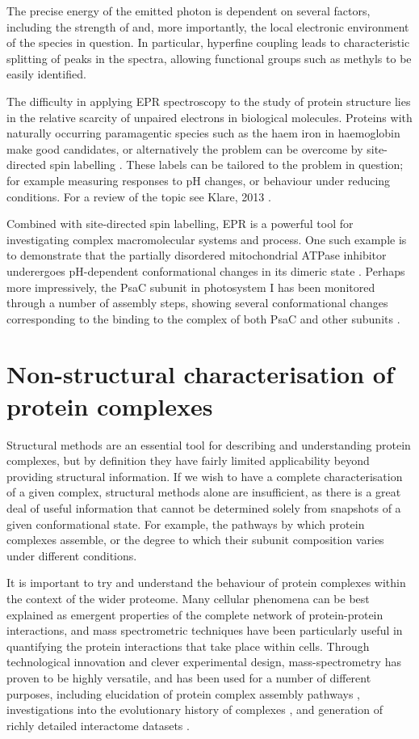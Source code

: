 \documentclass[a4paper,11pt,twoside,openright]{scrbook}
\begin{document}
The precise energy of the emitted photon is dependent on several factors,
including the strength of  and, more importantly, the local electronic
environment of the species in question. In particular, hyperfine coupling leads
to characteristic splitting of peaks in the spectra, allowing functional groups
such as methyls to be easily identified.

The difficulty in applying EPR spectroscopy to the study of protein structure
lies in the relative scarcity of unpaired electrons in biological molecules.
Proteins with naturally occurring paramagentic species such as the haem iron in
haemoglobin make good candidates, or alternatively the problem can be overcome
by site-directed spin labelling \cite{Altenbach1989,Altenbach1990}. These labels
can be tailored to the problem in question; for example measuring responses to
pH changes, or behaviour under reducing conditions. For a review of the topic
see Klare, 2013 \cite{Klare2013}.

Combined with site-directed spin labelling, EPR is a powerful tool for
investigating complex macromolecular systems and process. One such example is to
demonstrate that the partially disordered mitochondrial ATPase inhibitor
underergoes pH-dependent conformational changes in its dimeric state
\cite{LeBreton2016}. Perhaps more impressively, the PsaC subunit in photosystem
I has been monitored through a number of assembly steps, showing several
conformational changes corresponding to the binding to the complex of both PsaC
and other subunits \cite{Jagannathan2010}.

\section{Non-structural characterisation of protein complexes}
Structural methods are an essential tool for describing and understanding
protein complexes, but by definition they have fairly limited applicability
beyond providing structural information. If we wish to have a complete
characterisation of a given complex, structural methods alone are insufficient,
as there is a great deal of useful information that cannot be determined solely
from snapshots of a given conformational state. For example, the pathways by
which protein complexes assemble, or the degree to which their subunit
composition varies under different conditions.

It is important to try and understand the behaviour of protein complexes within
the context of the wider proteome. Many cellular phenomena can be best explained
as emergent properties of the complete network of protein-protein interactions,
and mass spectrometric techniques have been particularly useful in quantifying
the protein interactions that take place within cells. Through technological
innovation and clever experimental design, mass-spectrometry has proven to be
highly versatile, and has been used for a number of different purposes,
including elucidation of protein complex assembly pathways
\cite{Levy2008,Marsh2013}, investigations into the evolutionary history of
complexes \cite{Wan2015}, and generation of richly detailed interactome datasets
\cite{Hein2015}.
\end{document}
